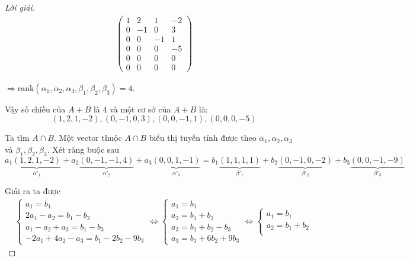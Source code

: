 \documentclass[class=linear-algebra,crop=false]{standalone}
\begin{document}
\begin{proof}[Lời giải]
\begin{align*}
\begin{pmatrix}
            1 & 2  & 1  & -2 \\
            0 & -1 & 0  & 3  \\
            0 & 0  & -1 & 1  \\
            0 & 0  & 0  & -5 \\
            0 & 0  & 0  & 0  \\
            0 & 0  & 0  & 0
        \end{pmatrix}
    \end{align*}
    \par $\Rightarrow\text{rank}(\alpha_{1},\alpha_{2},\alpha_{3},\beta_{1},\beta_{2},\beta_{3}) = 4$.
    \par Vậy số chiều của $A + B$ là $4$ và một cơ sở của $A + B$ là:
    \[ (1, 2, 1, -2), (0, -1, 0, 3), (0, 0, -1, 1), (0, 0, 0, -5) \]
    \par Ta tìm $A\cap B$. Một vector thuộc $A\cap B$ biểu thị tuyến tính được theo $\alpha_{1}, \alpha_{2}, \alpha_{3}$ và $\beta_{1}, \beta_{2}, \beta_{3}$. Xét ràng buộc sau
    \[ a_{1}\underbrace{(1,2,1,-2)}_{\alpha'_{1}} + a_{2}\underbrace{(0,-1,-1,4)}_{\alpha'_{2}} + a_{3}\underbrace{(0,0,1,-1)}_{\alpha'_{3}} = b_{1}\underbrace{(1,1,1,1)}_{\beta'_{1}} + b_{2}\underbrace{(0,-1,0,-2)}_{\beta'_{2}} + b_{3}\underbrace{(0,0,-1,-9)}_{\beta'_{3}} \]
    \par Giải ra ta được
    \begin{align*}
         & \begin{cases}
               a_{1} = b_{1}                         \\
               2a_{1} - a_{2} = b_{1} - b_{2}        \\
               a_{1} - a_{2} + a_{3} = b_{1} - b_{3} \\
               -2a_{1} + 4a_{2} - a_{3} = b_{1} - 2b_{2} - 9b_{3}
           \end{cases}
        \Longleftrightarrow
        \begin{cases}
            a_{1} = b_{1}                 \\
            a_{2} = b_{1} + b_{2}         \\
            a_{3} = b_{1} + b_{2} - b_{3} \\
            a_{3} = b_{1} + 6b_{2} + 9b_{3}
        \end{cases}
        \Longleftrightarrow
        \begin{cases}
            a_{1} = b_{1}                 \\
            a_{2} = b_{1} + b_{2}         \\

\end{cases}
\end{align*}
\end{proof}
\end{document}
